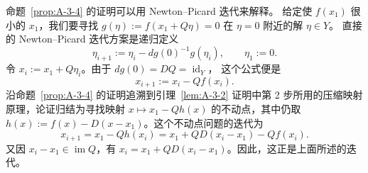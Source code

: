 \begin{remark}\label{rem:A-3-5}
命题~\ref{prop:A-3-4} 的证明可以用 Newton--Picard 迭代来解释。
给定使 $f(x_1)$ 很小的 $x_1$，我们要寻找
$g(\eta):=f(x_1+Q\eta)=0$ 在 $\eta=0$ 附近的解 $\eta\in Y$。
直接的 Newton--Picard 迭代方案是递归定义
\[
  \eta_{i+1}:=\eta_i-dg(0)^{-1}g(\eta_i),
  \qquad \eta_1:=0.
\]
令 $x_i:=x_1+Q\eta_i$。由于
$dg(0)=DQ=\operatorname{id}_Y$，
这个公式便是
\[
  x_{i+1}:=x_i-Qf(x_i).
\]
沿命题~\ref{prop:A-3-4} 的证明追溯到引理~\ref{lem:A-3-2}
证明中第 2 步所用的压缩映射原理，论证归结为寻找映射
$x\mapsto x_1-Qh(x)$ 的不动点，其中仍取
$h(x):=f(x)-D(x-x_1)$。这个不动点问题的迭代为
\[
  x_{i+1}=x_1-Qh(x_i)
  =x_1+QD(x_i-x_1)-Qf(x_i).
\]
又因 $x_i-x_1\in\operatorname{im}Q$，有
$x_i=x_1+QD(x_i-x_1)$。因此，这正是上面所述的迭代。
\end{remark}

